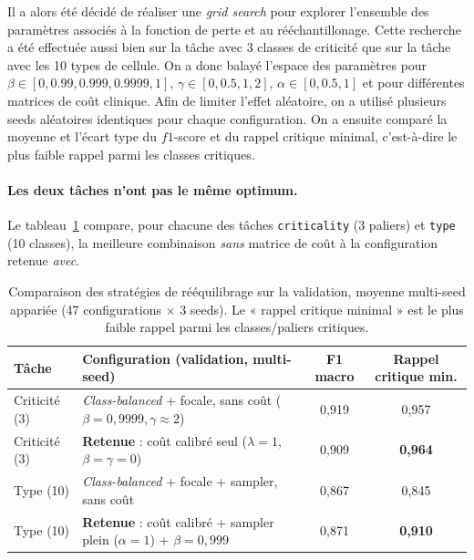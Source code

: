 Il a alors été décidé de réaliser une \textit{grid search} pour explorer l'ensemble des paramètres associés à la fonction de perte et au rééchantillonage.
Cette recherche a été effectuée aussi bien sur la tâche avec 3 classes de criticité que sur la tâche avec les 10 types de cellule.
On a donc balayé l'espace des paramètres pour $\beta\in[0, 0.99, 0.999, 0.9999, 1]$, $\gamma\in[0, 0.5, 1, 2]$, $\alpha\in [0, 0.5, 1]$ et pour différentes matrices de coût clinique.
Afin de limiter l'effet aléatoire, on a utilisé plusieurs seeds aléatoires identiques pour chaque configuration.
On a ensuite comparé la moyenne et l'écart type du $f1$-score et du rappel critique minimal, c'est-à-dire le plus faible rappel parmi les classes critiques.

\paragraph{Les deux tâches n’ont pas le même optimum.}
Le tableau~\ref{tab:imbalance-grid} compare, pour chacune des tâches \texttt{criticality} (3 paliers) et \texttt{type} (10 classes), la meilleure combinaison \emph{sans} matrice de coût à la configuration retenue \emph{avec}.

\begin{table}[H]
  \centering
  \small
  \renewcommand{\arraystretch}{1.25}
  \begin{tabularx}{\textwidth}{@{}l X cc@{}}
    \toprule
    Tâche & Configuration (validation, multi-seed) & F1 macro & Rappel critique min. \\
    \midrule
    Criticité (3) & \emph{Class-balanced} + focale, sans coût ($\beta{=}0{,}9999,\gamma{\approx}2$) & 0,919 & 0,957 \\
    Criticité (3) & \textbf{Retenue} : coût calibré seul ($\lambda{=}1$, $\beta{=}\gamma{=}0$) & 0,909 & \textbf{0,964} \\
    Type (10)     & \emph{Class-balanced} + focale + sampler, sans coût & 0,867 & 0,845 \\
    Type (10)     & \textbf{Retenue} : coût calibré + sampler plein ($\alpha{=}1$) + $\beta{=}0{,}999$ & 0,871 & \textbf{0,910} \\
    \bottomrule
  \end{tabularx}
  \caption{Comparaison des stratégies de rééquilibrage sur la validation, moyenne multi-seed appariée (47 configurations $\times$ 3 seeds).
Le « rappel critique minimal » est le plus faible rappel parmi les classes/paliers critiques.}
  \label{tab:imbalance-grid}
\end{table}

